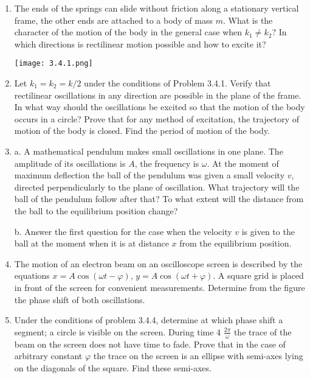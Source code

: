 \documentclass{article}
\begin{document}
\begin{enumerate}[label=3.4.\arabic*]

\item The ends of the springs can slide without friction along a stationary vertical frame, the other ends are attached to a body of mass $m$. What is the character of the motion of the body in the general case when $k_1 \neq k_2$? In which directions is rectilinear motion possible and how to excite it?

\begin{center}
    \texttt{[image: 3.4.1.png]}
\end{center}


\item Let $k_1 = k_2 = k/2$ under the conditions of Problem 3.4.1. Verify that rectilinear oscillations in any direction are possible in the plane of the frame. In what way should the oscillations be excited so that the motion of the body occurs in a circle? Prove that for any method of excitation, the trajectory of motion of the body is closed. Find the period of motion of the body.

\item a. A mathematical pendulum makes small oscillations in one plane. The amplitude of its oscillations is $A$, the frequency is $\omega$. At the moment of maximum deflection the ball of the pendulum was given a small velocity $v$, directed perpendicularly to the plane of oscillation. What trajectory will the ball of the pendulum follow after that? To what extent will the distance from the ball to the equilibrium position change? 

b. Answer the first question for the case when the velocity $v$ is given to the ball at the moment when it is at distance $x$ from the equilibrium position.

\item The motion of an electron beam on an oscilloscope screen is described by the equations $x = A \cos{(\omega t - \varphi)}$, $y = A \cos{(\omega t + \varphi)}$. A square grid is placed in front of the screen for convenient measurements. Determine from the figure the phase shift of both oscillations.

\item Under the conditions of problem 3.4.4, determine at which phase shift a segment; a circle is visible on the screen. During time 4
$\frac{2\pi}{\omega}$ the trace of the beam on the screen does not have time to fade. Prove that in the case of arbitrary constant $\varphi$ the trace on the screen is an ellipse with semi-axes lying on the diagonals of the square. Find these semi-axes.


\end{enumerate}
\end{document}
